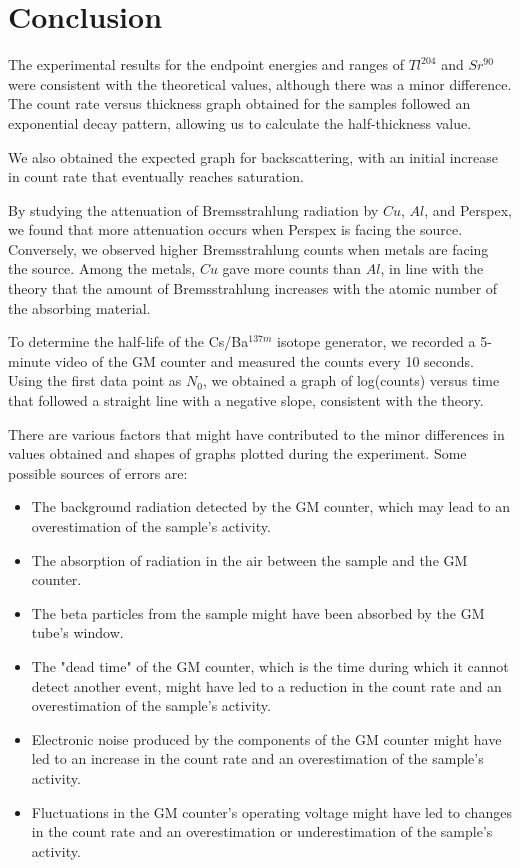 \section{Conclusion}
	The experimental results for the endpoint energies and ranges of $Tl^{204}$ and $Sr^{90}$ were consistent with the theoretical values, although there was a minor difference. The count rate versus thickness graph obtained for the samples followed an exponential decay pattern, allowing us to calculate the half-thickness value.

	We also obtained the expected graph for backscattering, with an initial increase in count rate that eventually reaches saturation.

	By studying the attenuation of Bremsstrahlung radiation by $Cu$, $Al$, and Perspex, we found that more attenuation occurs when Perspex is facing the source. Conversely, we observed higher Bremsstrahlung counts when metals are facing the source. Among the metals, $Cu$ gave more counts than $Al$, in line with the theory that the amount of Bremsstrahlung increases with the atomic number of the absorbing material.

	To determine the half-life of the Cs/Ba$^{137m}$ isotope generator, we recorded a 5-minute video of the GM counter and measured the counts every 10 seconds. Using the first data point as $N_0$, we obtained a graph of log(counts) versus time that followed a straight line with a negative slope, consistent with the theory.

	There are various factors that might have contributed to the minor differences in values obtained and shapes of graphs plotted during the experiment. Some possible sources of errors are:
	\begin{itemize}
		\item The background radiation detected by the GM counter, which may lead to an overestimation of the sample's activity.
		\item The absorption of radiation in the air between the sample and the GM counter.
		\item The beta particles from the sample might have been absorbed by the GM tube's window.
		\item The "dead time" of the GM counter, which is the time during which it cannot detect another event, might have led to a reduction in the count rate and an overestimation of the sample's activity.
		\item Electronic noise produced by the components of the GM counter might have led to an increase in the count rate and an overestimation of the sample's activity.
		\item Fluctuations in the GM counter's operating voltage might have led to changes in the count rate and an overestimation or underestimation of the sample's activity.
	\end{itemize}